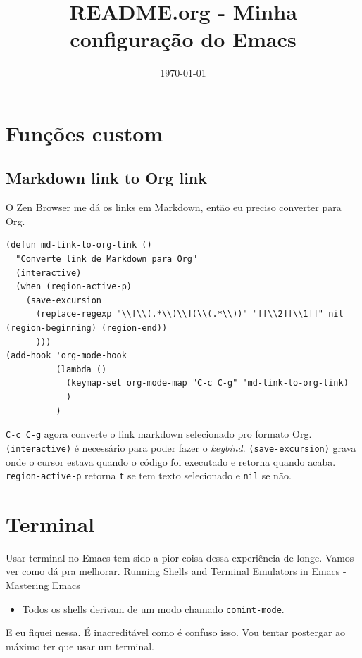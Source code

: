 \documentclass[11pt]{article}
\date{\today}
\title{README.org - Minha configuração do Emacs}
\begin{document}
\maketitle
\tableofcontents

\section{Funções custom}
\label{sec:org9898316}
\subsection{Markdown link to Org link}
\label{sec:org73bd5f6}
O Zen Browser me dá os links em Markdown, então eu preciso converter para Org.
\begin{verbatim}
(defun md-link-to-org-link ()
  "Converte link de Markdown para Org"
  (interactive)
  (when (region-active-p)
    (save-excursion
      (replace-regexp "\\[\\(.*\\)\\](\\(.*\\))" "[[\\2][\\1]]" nil (region-beginning) (region-end))
      )))
(add-hook 'org-mode-hook
          (lambda ()
            (keymap-set org-mode-map "C-c C-g" 'md-link-to-org-link)
            )
          )
\end{verbatim}
\texttt{C-c C-g} agora converte o link markdown selecionado pro formato Org.
\texttt{(interactive)} é necessário para poder fazer o \emph{keybind}.
\texttt{(save-excursion)} grava onde o cursor estava quando o código foi executado e retorna quando acaba.
\texttt{region-active-p} retorna \texttt{t} se tem texto selecionado e \texttt{nil} se não.
\section{Terminal}
\label{sec:orgdf55e80}
Usar terminal no Emacs tem sido a pior coisa dessa experiência de longe. Vamos ver como dá pra melhorar.
\href{https://www.masteringemacs.org/article/running-shells-in-emacs-overview}{Running Shells and Terminal Emulators in Emacs - Mastering Emacs}
\begin{itemize}
\item Todos os shells derivam de um modo chamado \texttt{comint-mode}.
\end{itemize}

E eu fiquei nessa. É inacreditável como é confuso isso. Vou tentar postergar ao máximo ter que usar um terminal.
\end{document}

